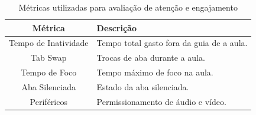 \begin{table}[H]
    \centering
    \vspace{0.5cm}
    \begin{tabular}{|c|l|}
        \hline
        Métrica              & Descrição                                 \\
        \hline
        Tempo de Inatividade & Tempo total gasto fora da guia de a aula. \\
        Tab Swap             & Trocas de aba durante a aula.             \\
        Tempo de Foco        & Tempo máximo de foco na aula.             \\
        Aba Silenciada       & Estado da aba silenciada.                 \\
        Periféricos          & Permissionamento de áudio e vídeo.        \\
        \hline
    \end{tabular}
    \caption{Métricas utilizadas para avaliação de atenção e engajamento}
    \label{tab:metrics}
\end{table}
